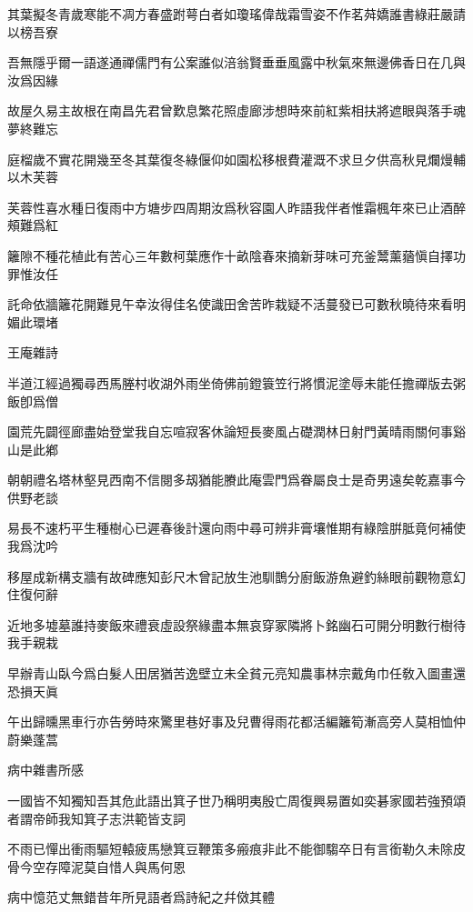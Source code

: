 \documentclass{zhvt-classic-Miya}
\begin{document}
其葉擬冬青歲寒能不凋方春盛跗萼白者如瓊瑤偉哉霜雪姿不作茗荈嬌誰書綠莊嚴請以榜吾寮

吾無隱乎爾一語遂通禪儒門有公案誰似涪翁賢垂垂風露中秋氣來無邊佛香日在几與汝爲因緣

故屋久易主故根在南昌先君曾歎息繁花照虛廊涉想時來前紅紫相扶將遮眼與落手魂夢終難忘

庭榴歲不實花開幾至冬其葉復冬綠偃仰如園松移根費灌溉不求旦夕供高秋見爛熳輔以木芙蓉

芙蓉性喜水種日復雨中方塘步四周期汝爲秋容園人昨語我伴者惟霜楓年來已止酒醉頰難爲紅

籬隙不種花植此有苦心三年數柯葉應作十畝陰春來摘新芽味可充釜鬵薰蕕愼自擇功罪惟汝任

託命依牆籬花開難見午幸汝得佳名使識田舍苦昨栽疑不活蔓發已可數秋曉待來看明媚此環堵

\begin{fw}王庵雜詩\end{fw}

半道江經過獨尋西馬塍村收湖外雨坐倚佛前鐙簑笠行將慣泥塗辱未能任擔禪版去粥飯卽爲僧

園荒先闢徑廊盡始登堂我自忘喧寂客休論短長麥風占礎潤林日射門黃晴雨關何事谿山是此鄕

朝朝禮名塔林壑見西南不信閱多刼猶能賸此庵雲門爲眷屬良士是奇男遠矣乾嘉事今供野老談

易長不速朽平生種樹心已遲春後計還向雨中尋可辨非膏壤惟期有綠陰腁胝竟何補使我爲沈吟

移屋成新構支牆有故碑應知彭尺木曾記放生池馴鵲分廚飯游魚避釣絲眼前觀物意幻住復何辭

近地多墟墓誰持麥飯來禮衰虛設祭緣盡本無哀穿冢隣將卜銘幽石可開分明數行樹待我手親栽

早辦青山臥今爲白髮人田居猶苦逸壁立未全貧元亮知農事林宗戴角巾任敎入圖畫還恐損天眞

午出歸曛黑車行亦告勞時來驚里巷好事及兒曹得雨花都活編籬筍漸高旁人莫相恤仲蔚樂蓬蒿

\begin{fw}病中雜書所感\end{fw}

一國皆不知獨知吾其危此語出箕子世乃稱明夷殷亡周復興易置如奕碁家國若強預頌者謂帝師我知箕子志洪範皆支詞

不雨已憚出衝雨驅短轅疲馬戀箕豆鞭策多瘢痕非此不能御騶卒日有言銜勒久未除皮骨今空存障泥莫自惜人與馬何恩

\begin{fw}病中憶范丈無錯昔年所見語者爲詩紀之幷傚其體\end{fw}
\end{document}
